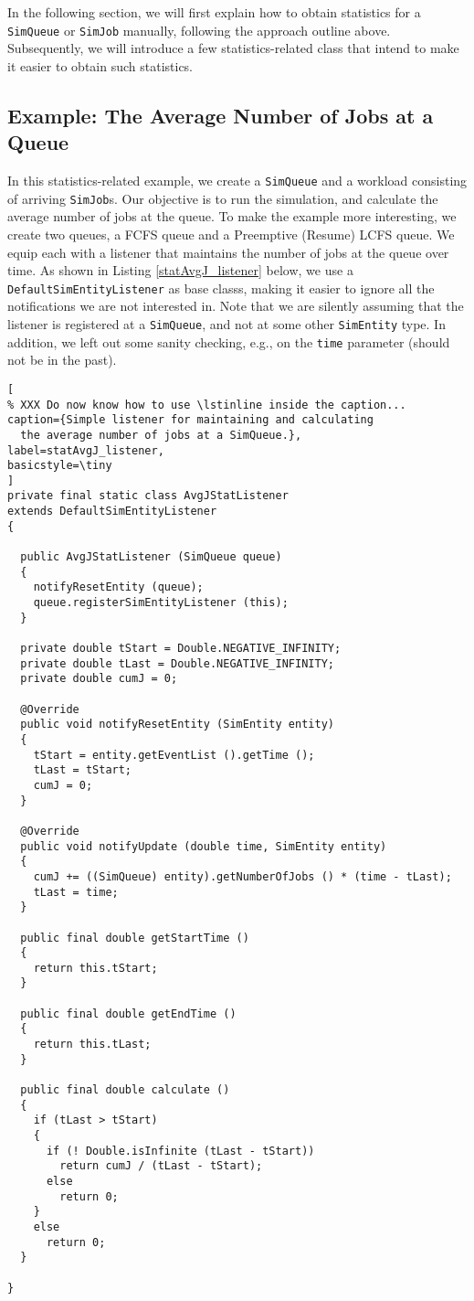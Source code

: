 \documentclass[12pt]{book}
\begin{document}
In the following section, we will first explain how to obtain statistics
  for a \lstinline|SimQueue| or \lstinline|SimJob| manually,
  following the approach outline above.
Subsequently,
  we will introduce a few statistics-related class
  that intend to make it easier to
  obtain such statistics.

\subsection{Example: The Average Number of Jobs at a Queue}
\label{stat-intro-avgJ}

In this statistics-related example,
  we create a \lstinline|SimQueue| and
  a workload consisting of arriving \lstinline|SimJob|s.
Our objective is to run the simulation,
  and calculate the average number of jobs at the queue.
To make the example more interesting, we create two queues,
  a FCFS queue and a Preemptive (Resume) LCFS queue.
We equip each with a listener that maintains the
  number of jobs at the queue over time.
As shown in Listing \ref{statAvgJ_listener} below,
  we use a \lstinline|DefaultSimEntityListener| as
  base classs,
  making it easier to ignore all the notifications
  we are not interested in.
Note that we are silently assuming that the listener
  is registered at a \lstinline|SimQueue|,
  and not at some other \lstinline|SimEntity| type.
In addition, we left out some sanity checking,
  e.g., on the \lstinline|time| parameter
  (should not be in the past).

\begin{lstlisting}[
% XXX Do now know how to use \lstinline inside the caption...
caption={Simple listener for maintaining and calculating
  the average number of jobs at a SimQueue.},
label=statAvgJ_listener,
basicstyle=\tiny
]
private final static class AvgJStatListener
extends DefaultSimEntityListener
{
  
  public AvgJStatListener (SimQueue queue)
  {
    notifyResetEntity (queue);
    queue.registerSimEntityListener (this);
  }
    
  private double tStart = Double.NEGATIVE_INFINITY;
  private double tLast = Double.NEGATIVE_INFINITY;
  private double cumJ = 0;

  @Override
  public void notifyResetEntity (SimEntity entity)
  {
    tStart = entity.getEventList ().getTime ();
    tLast = tStart;
    cumJ = 0;
  }

  @Override
  public void notifyUpdate (double time, SimEntity entity)
  {
    cumJ += ((SimQueue) entity).getNumberOfJobs () * (time - tLast);
    tLast = time;
  }
      
  public final double getStartTime ()
  {
    return this.tStart;
  }
    
  public final double getEndTime ()
  {
    return this.tLast;
  }
    
  public final double calculate ()
  {
    if (tLast > tStart)
    {
      if (! Double.isInfinite (tLast - tStart))
        return cumJ / (tLast - tStart);
      else
        return 0;
    }
    else
      return 0;
  }

}
\end{lstlisting}
\end{document}
